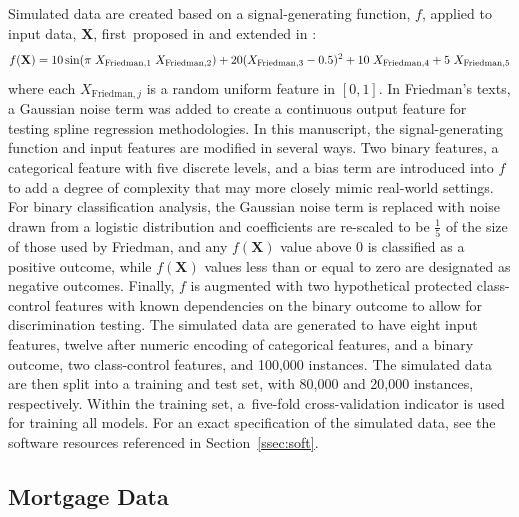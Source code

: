 \documentclass[information,article,accept,moreauthors,pdftex]{Definitions/mdpi}
\begin{document}
{{Simulated data are created based on a signal-generating function, $f$, applied to input data, $\mathbf{X}$, first~proposed in \citet{friedman1979tree} and extended in \citet{friedman1991multivariate}:
\begin{equation}
\begin{aligned}\label{eq:sim}\small
f(\mathbf{X}) = 10\sin(\pi~X_{\text{Friedman},1}~X_{\text{Friedman},2}) + 20(X_{\text{Friedman},3} - 0.5)^2 + 10~X_{\text{Friedman},4} + 5~X_{\text{Friedman},5}
\end{aligned}
\end{equation}
where each $X_{\text{Friedman},j}$ is a random uniform feature in $[0,1]$. In Friedman's texts, a Gaussian noise term was added to create a continuous output feature for testing spline regression methodologies. In this manuscript, the signal-generating function and input features are modified in several ways.  Two binary features, a categorical feature with five discrete levels, and a bias term are introduced into $f$ to add a degree of complexity that may more closely mimic real-world settings. 
For binary classification analysis, the Gaussian noise term is replaced with noise drawn from a logistic distribution and coefficients are re-scaled to be $\frac{1}{5}$ of the size of those used by Friedman, and any $f(\mathbf{X})$ value above 0 is classified as a positive outcome, while $f(\mathbf{X})$ values less than or equal to zero are designated as negative outcomes.  Finally, $f$ is augmented with two hypothetical protected class-control features with known dependencies on the binary outcome to allow for discrimination testing. The simulated data are generated to have eight input features, twelve after numeric encoding of categorical features, and a binary outcome, two class-control features, and 100,000 instances. The simulated data are then split into a training and test set, with 80,000 and 20,000 instances, respectively.  Within the training set, a~five-fold cross-validation indicator is used for training all models. For an exact specification of the simulated data, see the software resources referenced in Section~\ref{ssec:soft}.


\subsection{Mortgage Data}\label{ssec:mort_data}

}}
\end{document}
